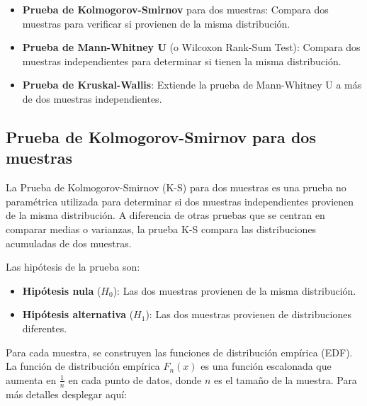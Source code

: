 \documentclass[
  letterpaper,
  DIV=11,
  numbers=noendperiod]{scrreprt}
\providecommand{\tightlist}{%
  \setlength{\itemsep}{0pt}\setlength{\parskip}{0pt}}\usepackage{longtable,booktabs,array}
\begin{document}
\begin{itemize}
\tightlist
\item
  \textbf{Prueba de Kolmogorov-Smirnov} para dos muestras: Compara dos
  muestras para verificar si provienen de la misma distribución.
\item
  \textbf{Prueba de Mann-Whitney U} (o Wilcoxon Rank-Sum Test): Compara
  dos muestras independientes para determinar si tienen la misma
  distribución.
\item
  \textbf{Prueba de Kruskal-Wallis}: Extiende la prueba de Mann-Whitney
  U a más de dos muestras independientes.
\end{itemize}

\hypertarget{prueba-de-kolmogorov-smirnov-para-dos-muestras}{%
\subsection{Prueba de Kolmogorov-Smirnov para dos
muestras}\label{prueba-de-kolmogorov-smirnov-para-dos-muestras}}

La Prueba de Kolmogorov-Smirnov (K-S) para dos muestras es una prueba no
paramétrica utilizada para determinar si dos muestras independientes
provienen de la misma distribución. A diferencia de otras pruebas que se
centran en comparar medias o varianzas, la prueba K-S compara las
distribuciones acumuladas de dos muestras.

Las hipótesis de la prueba son:

\begin{itemize}
\tightlist
\item
  \textbf{Hipótesis nula} (\(H_0\)): Las dos muestras provienen de la
  misma distribución.
\item
  \textbf{Hipótesis alternativa} (\(H_1\)): Las dos muestras provienen
  de distribuciones diferentes.
\end{itemize}

Para cada muestra, se construyen las funciones de distribución empírica
(EDF). La función de distribución empírica \(F_n(x)\) es una función
escalonada que aumenta en \(\frac{1}{n}\) en cada punto de datos, donde
\(n\) es el tamaño de la muestra. Para más detalles desplegar aquí:
\end{document}
